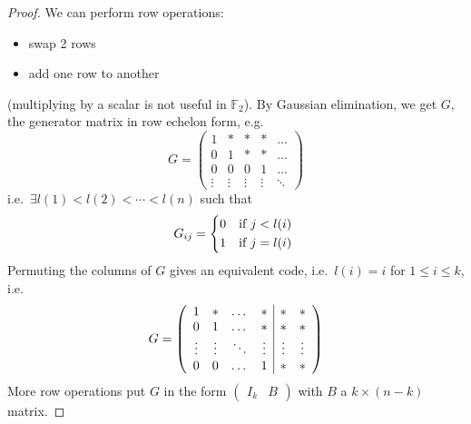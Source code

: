 \documentclass{article}
\newcommand{\1}[1]{\mathbbm{1}_{#1}}
\begin{document}
\begin{proof}
    We can perform row operations:
    \begin{itemize}
        \item swap 2 rows
        \item add one row to another
    \end{itemize}
    (multiplying by a scalar is not useful in $\mathbb{F}_2$).
    By Gaussian elimination, we get $G$, the generator matrix in row echelon form, e.g.\
    \begin{equation*}
        G =
        \begin{pmatrix}
            1 & * & * & * & \dots \\
            0 & 1 & * & * & \dots \\
            0 & 0 & 0 & 1 & \dots \\
            \vdots & \vdots & \vdots & \vdots & \ddots
        \end{pmatrix}
    \end{equation*}
    i.e.\ $\exists l(1) < l(2) < \dotsb < l(n)$ such that
    \begin{equation*}
        G_{ij} =
        \begin{dcases*}
            0 & if $j < l(i)$ \\
            1 & if $j = l(i)$ \\
        \end{dcases*}
    \end{equation*}
    Permuting the columns of $G$ gives an equivalent code, i.e.\ $l(i) = i$ for $1 \leq i \leq k$, i.e.\
    \begin{equation*}
        G =
        \left(
            \begin{array}{c c c c | c c}
                1 & * & \dots & * & * & *\\
                0 & 1 & \dots & * & * & *\\
                \vdots & \vdots & \ddots & \vdots & \vdots & \vdots\\
                0 & 0 & \dots & 1 & * & *\\
            \end{array}
        \right)
    \end{equation*}
    More row operations put $G$ in the form $\left( \begin{array}{c|c} I_k & B \end{array}\right)$ with $B$ a $k \times (n-k)$ matrix.
\end{proof}
\end{document}
